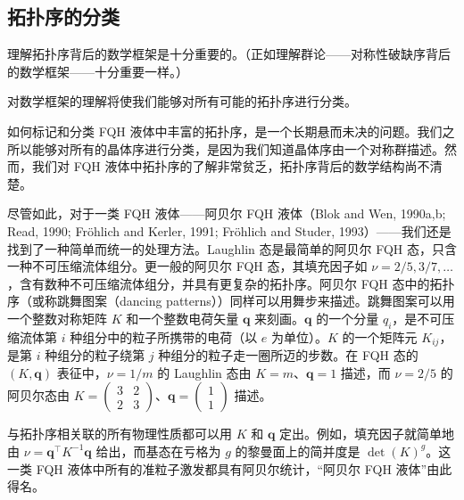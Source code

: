 
\subsection{拓扑序的分类}

\begin{keypoints}
\item 理解拓扑序背后的数学框架是十分重要的。（正如理解群论——对称性破缺序背后的数学框架——十分重要一样。）
\item 对数学框架的理解将使我们能够对所有可能的拓扑序进行分类。
\end{keypoints}

如何标记和分类 FQH 液体中丰富的拓扑序，是一个长期悬而未决的问题。我们之所以能够对所有的晶体序进行分类，是因为我们知道晶体序由一个对称群描述。然而，我们对 FQH 液体中拓扑序的了解非常贫乏，拓扑序背后的数学结构尚不清楚。

尽管如此，对于一类 FQH 液体——阿贝尔 FQH 液体（Blok and Wen, 1990a,b; Read, 1990; Fröhlich and Kerler, 1991; Fröhlich and Studer, 1993）——我们还是找到了一种简单而统一的处理方法。Laughlin 态是最简单的阿贝尔 FQH 态，只含一种不可压缩流体组分。更一般的阿贝尔 FQH 态，其填充因子如 $\nu=2/5,3/7,\ldots$，含有数种不可压缩流体组分，并具有更复杂的拓扑序。阿贝尔 FQH 态中的拓扑序（或称跳舞图案（dancing patterns））同样可以用舞步来描述。跳舞图案可以用一个整数对称矩阵 $K$ 和一个整数电荷矢量 $\pmb{q}$ 来刻画。$\pmb{q}$ 的一个分量 $q_{i}$，是不可压缩流体第 $i$ 种组分中的粒子所携带的电荷（以 $e$ 为单位）。$K$ 的一个矩阵元 $K_{ij}$，是第 $i$ 种组分的粒子绕第 $j$ 种组分的粒子走一圈所迈的步数。在 FQH 态的 $(K,\pmb{q})$ 表征中，$\nu=1/m$ 的 Laughlin 态由 $K=m$、$\pmb{q}=1$ 描述，而 $\nu=2/5$ 的阿贝尔态由 $K=\begin{pmatrix}3&2\\2&3\end{pmatrix}$、$\pmb{q}=\begin{pmatrix}1\\1\end{pmatrix}$ 描述。

与拓扑序相关联的所有物理性质都可以用 $K$ 和 $\pmb{q}$ 定出。例如，填充因子就简单地由 $\nu=\pmb{q}^{\top}K^{-1}\pmb{q}$ 给出，而基态在亏格为 $g$ 的黎曼面上的简并度是 $\det(K)^{g}$。这一类 FQH 液体中所有的准粒子激发都具有阿贝尔统计，“阿贝尔 FQH 液体”由此得名。

